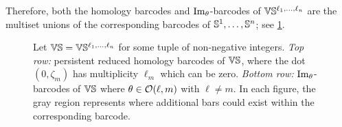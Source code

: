 Therefore, both the homology barcodes and \(\operatorname{Im}_\theta\)-barcodes of \(\mathbb{V}\mathbb{S}^{\ell_1, \dots, \ell_n}\) are the multiset unions of the corresponding barcodes of \(\mathbb{S}^1, \dots, \mathbb{S}^n\); see \cref{fig:barcodes_vs}.



\begin{figure}
	\centering
	
	\caption{Let $\mathbb{V}\mathbb{S} = \mathbb{V}\mathbb{S}^{\ell_1,\dots,\ell_n}$ for some tuple of non-negative integers.
		\emph{Top row:} persistent reduced homology barcodes of $\mathbb{V}\mathbb{S}$, where the dot $(0,\zeta_m)$ has multiplicity $\ell_m$ which can be zero.
		\emph{Bottom row:} $\operatorname{Im}_\theta$-barcodes of $\mathbb{V}\mathbb{S}$ where $\theta \in \mathcal{O}(\ell,m)$ with \(\ell \neq m\).
        In each figure, the gray region represents where additional bars could exist within the corresponding barcode. }
	\label{fig:barcodes_vs}
\end{figure}